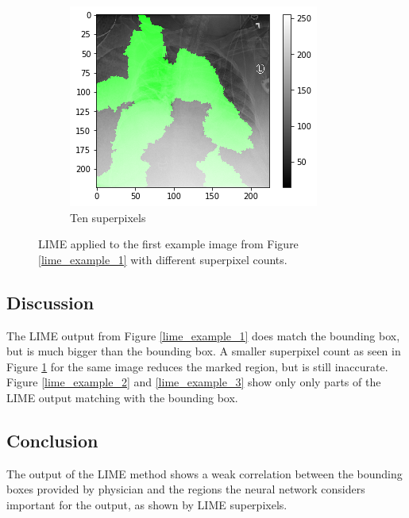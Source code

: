 \begin{figure}[H]
\begin{subfigure}[b]{.4\textwidth}
        \centering
        \includegraphics[width=\linewidth]{chapters/03_classification/images/lime_sp_10.png}
        \caption{Ten superpixels}
    \end{subfigure}
    \caption{LIME applied to the first example image from Figure \ref{lime_example_1} with different superpixel counts.}
    \label{lime_superpixel_count}
\end{figure}

\subsection{Discussion}
The LIME output from Figure \ref{lime_example_1} does match the bounding box, but is much bigger than the bounding box. A smaller superpixel count as seen in Figure \ref{lime_superpixel_count} for the same image reduces the marked region, but is still inaccurate. Figure \ref{lime_example_2} and \ref{lime_example_3} show only only parts of the LIME output matching with the bounding box.

\subsection{Conclusion}
The output of the LIME method shows a weak correlation between the bounding boxes provided by physician and the regions the neural network considers important for the output, as shown by LIME superpixels.

